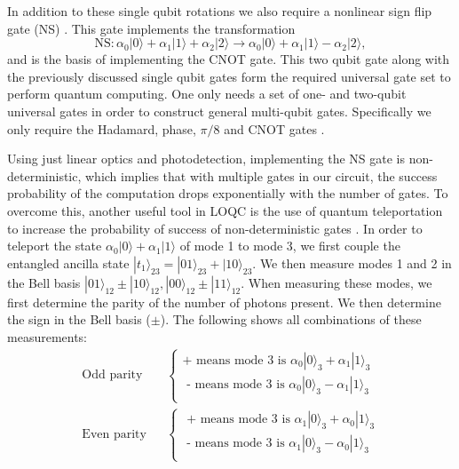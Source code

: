 \documentclass[aps,pra,twocolumn,amsmath,amssymb,nofootinbib,superscriptaddress]{revtex4}
\newcommand{\ket}[1]{|#1\rangle}
\begin{document}
In addition to these single qubit rotations we also require a nonlinear sign flip gate (NS) \cite{knill}. This gate implements the transformation 
\begin{equation}
\mathrm{NS}: \alpha_0 \ket{0} + \alpha_1 \ket{1} +\alpha_2 \ket{2} \rightarrow \alpha_0 \ket{0} + \alpha_1 \ket{1} - \alpha_2 \ket{2},
\end{equation}
and is the basis of implementing the CNOT gate. This two qubit gate along with the previously discussed single qubit gates form the required universal gate set to perform quantum computing. One only needs a set of one- and two-qubit universal gates in order to construct general multi-qubit gates. Specifically we only require the Hadamard, phase, $\pi/8$ and CNOT gates \cite{nielsen}.

Using just linear optics and photodetection, implementing the NS gate is non-deterministic, which implies that with multiple gates in our circuit, the success probability of the computation drops exponentially with the number of gates. To overcome this, another useful tool in LOQC is the use of quantum teleportation to increase the probability of success of non-deterministic gates \cite{knill}. In order to teleport the state $\alpha_0 \ket{0} + \alpha_1 \ket{1}$ of mode 1 to mode 3, we first couple the entangled ancilla state $\ket{t_1}_{23} = \ket{01}_{23} + \ket{10}_{23}$. We then measure modes 1 and 2 in the Bell basis $\ket{01}_{12} \pm \ket{10}_{12}, \ket{00}_{12} \pm \ket{11}_{12}$. When measuring these modes, we first determine the parity of the number of photons present. We then determine the sign in the Bell basis ($\pm$). The following shows all combinations of these measurements:
\begin{eqnarray}
\textrm{Odd parity} && \left \{
\begin{array}{c}
\textrm{+ means mode 3 is  } \alpha_0 \ket{0}_3 + \alpha_1 \ket{1}_3  \\
\textrm{ - means mode 3 is  } \alpha_0 \ket{0}_3 - \alpha_1 \ket{1}_3 \\
\end{array} \right . \nonumber\\
\textrm{Even parity} && \left \{
\begin{array}{c}
\textrm{ + means mode 3 is  } \alpha_1 \ket{0}_3 + \alpha_0 \ket{1}_3 \\
\textrm{  - means mode 3 is  } \alpha_1 \ket{0}_3 - \alpha_0 \ket{1}_3 \\
\end{array} \right . \nonumber
\end{eqnarray}
\end{document}
